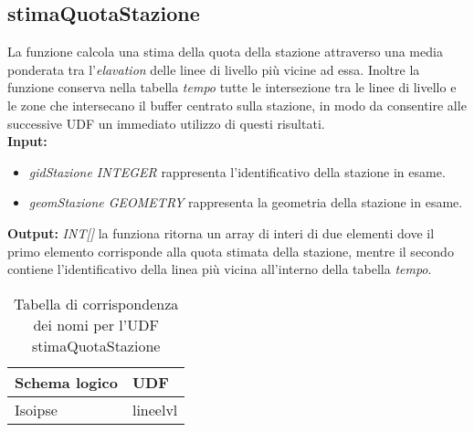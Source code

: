 \subsection{stimaQuotaStazione}
La funzione calcola una stima della quota della stazione attraverso una media ponderata tra l'\textit{elavation} delle linee di livello più vicine ad essa. Inoltre la funzione conserva nella tabella \textit{tempo} tutte le intersezione tra le linee di livello e le zone che intersecano il buffer centrato sulla stazione, in modo da consentire alle successive UDF un immediato utilizzo di questi risultati.\\
\textbf{Input:} 
\begin{itemize}
\item \textit{gidStazione INTEGER} rappresenta l'identificativo della stazione in esame.
\item \textit{geomStazione GEOMETRY} rappresenta la geometria della stazione in esame.
\end{itemize}
\textbf{Output:} \textit{INT[]} la funziona ritorna un array di interi di due elementi dove il primo elemento corrisponde alla quota stimata della stazione, mentre il secondo contiene l'identificativo della linea più vicina all'interno della tabella \textit{tempo}.

\begin{table}[h]
\centering
\caption{Tabella di corrispondenza dei nomi per l'UDF stimaQuotaStazione}
\label{mapTb2}
\begin{tabular}{|l|l|}
\hline
Schema logico & UDF      \\ \hline
Isoipse       & lineelvl \\ \hline
\end{tabular}
\end{table} 

